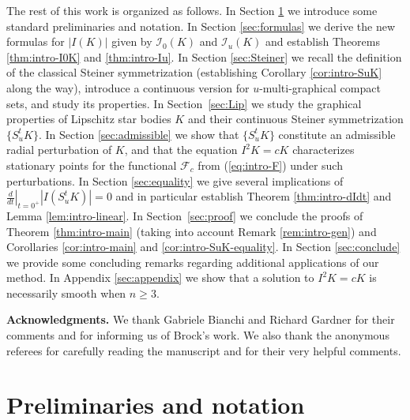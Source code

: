 \documentclass[11pt]{article}
\theoremstyle{definition}
\theoremstyle{proof}
\DeclareMathOperator{\+}{\mathop{\tilde{+}}}
\newcommand{\F}{\mathcal{F}}
\newcommand{\I}{\mathcal{I}}
\numberwithin{equation}{section}
\numberwithin{equation}{section}
\begin{document}
The rest of this work is organized as follows. In Section \ref{sec:prelim} we introduce some standard preliminaries and notation. In Section \ref{sec:formulas} we derive the new formulas for $|I(K)|$ given by $\I_0(K)$ and $\I_u(K)$ and establish Theorems \ref{thm:intro-I0K} and \ref{thm:intro-Iu}. In Section \ref{sec:Steiner} we recall the definition of the classical Steiner symmetrization (establishing Corollary \ref{cor:intro-SuK} along the way), introduce a continuous version for $u$-multi-graphical compact sets, and study its properties. In Section~\ref{sec:Lip} we study the graphical properties of Lipschitz star bodies $K$ and their continuous Steiner symmetrization $\{S_u^t K\}$. In Section \ref{sec:admissible} we show that $\{S_u^t K\}$ constitute an admissible radial perturbation of $K$, and that the equation $I^2 K = c K$ characterizes stationary points for the functional $\F_c$ from (\ref{eq:intro-F}) under such perturbations. In Section \ref{sec:equality} we give several implications of  $\left . \frac{d}{dt} \right|_{t=0^+} |I(S_u^t K)| = 0$ and in particular establish Theorem \ref{thm:intro-dIdt} and Lemma \ref{lem:intro-linear}. In Section~\ref{sec:proof} we conclude the proofs of Theorem \ref{thm:intro-main} (taking into account Remark \ref{rem:intro-gen}) and Corollaries \ref{cor:intro-main} and \ref{cor:intro-SuK-equality}. In Section \ref{sec:conclude} we provide some concluding remarks regarding additional applications of our method. In Appendix \ref{sec:appendix} we show that a solution to $I^2 K = c K$ is necessarily smooth when $n \geq 3$.

\medskip

\noindent
\textbf{Acknowledgments.} We thank Gabriele Bianchi and Richard Gardner for their comments and for informing us of Brock's work. 
We also thank the anonymous referees for carefully reading the manuscript and for their very helpful comments. 




\section{Preliminaries and notation} \label{sec:prelim}
\end{document}
